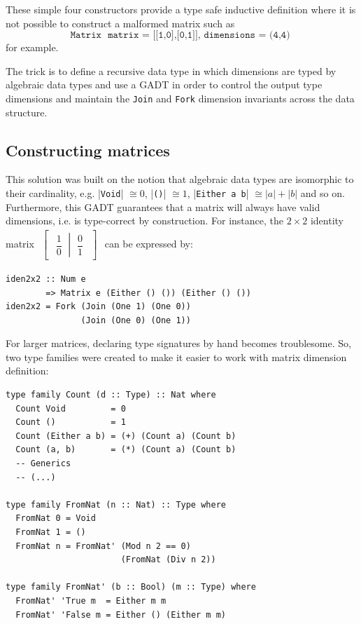 \documentclass[sigplan,screen]{acmart}\settopmatter{}
\newcommand{\hs}{\texttt}
\begin{document}
These simple four constructors provide a type safe inductive definition where it is not possible to construct a malformed matrix such as \[\hs{Matrix { matrix = [[1,0],[0,1]], dimensions = (4,4) }}\] for example.

The trick is to define a recursive data type in which dimensions are typed by algebraic data types and use a GADT in order to control the output type dimensions and maintain the \hs{Join} and \hs{Fork} dimension invariants across the data structure.

\subsection{Constructing matrices}

This solution was built on the notion that algebraic data types are isomorphic to their cardinality, e.g. |\hs{Void}| $ \cong 0$, |\hs{()}| $\cong 1$, |\hs{Either a b}| $\cong |a| + |b|$ and so on. Furthermore, this GADT guarantees that a matrix will always have valid dimensions, i.e. is type-correct by construction. For instance, the $2 \times 2$ identity matrix
%
$\begin{aligned}
\begin{bmatrix}
\left.\begin{matrix}
\dfrac{1}{0}
\end{matrix}\ \right|\ \begin{matrix}
\dfrac{0}{1}
\end{matrix}
\end{bmatrix}
\end{aligned}{}$ can be expressed by:
\vspace{1mm}
\begin{verbatim}
iden2x2 :: Num e 
        => Matrix e (Either () ()) (Either () ())
iden2x2 = Fork (Join (One 1) (One 0)) 
               (Join (One 0) (One 1))
\end{verbatim}
\vspace{1mm}

For larger matrices, declaring type signatures by hand becomes troublesome. So, two type families were created to make it easier to work with matrix dimension definition:

\vspace{1mm}
\begin{verbatim}
type family Count (d :: Type) :: Nat where
  Count Void         = 0
  Count ()           = 1
  Count (Either a b) = (+) (Count a) (Count b)
  Count (a, b)       = (*) (Count a) (Count b)
  -- Generics
  -- (...)
  
type family FromNat (n :: Nat) :: Type where
  FromNat 0 = Void
  FromNat 1 = ()
  FromNat n = FromNat' (Mod n 2 == 0) 
                       (FromNat (Div n 2))

type family FromNat' (b :: Bool) (m :: Type) where
  FromNat' 'True m  = Either m m
  FromNat' 'False m = Either () (Either m m)
\end{verbatim}
\vspace{1mm}
\end{document}
